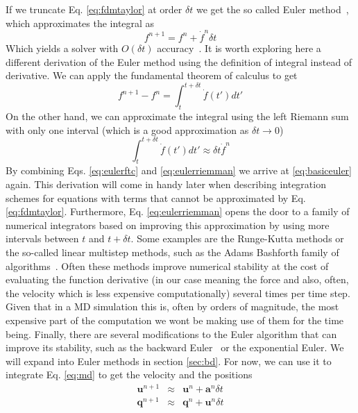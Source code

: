 \documentclass[twoside,openright,titlepage,numbers=noenddot,%
headinclude,footinclude,cleardoublepage=empty,abstract=on,
BCOR=5mm,fontsize=11pt, dvipsnames, paper=b5
]{scrreprt}
\renewcommand{\vec}[1]{\bm{#1}}
\newcommand{\dt}{\delta t}
\newcommand{\ppos}{q}
\newcommand{\pvel}{u}
\begin{document}
If we truncate Eq. \eqref{eq:fdmtaylor} at order $\dt$ we get the so called Euler method~\cite{Butcher2016}, which approximates the integral as
\begin{equation}
  \label{eq:basiceuler}
  f^{n+1} = f^n + \dot{f}^n\dt
\end{equation}
Which yields a solver with $O(\dt)$ accuracy~\cite{Butcher2016}.
It is worth exploring here a different derivation of the Euler method using the definition of integral instead of derivative. We can apply the fundamental theorem of calculus to get
\begin{equation}
  \label{eq:eulerftc}
  f^{n+1} - f^n = \int_t^{t+\dt}\dot{f}(t')dt'
\end{equation}
On the other hand, we can approximate the integral using the left Riemann sum with only one interval (which is a good approximation as $\dt\rightarrow 0$)
\begin{equation}
  \label{eq:eulerriemman}
  \int_t^{t+\dt}\dot{f}(t')dt' \approx \dt \dot{f}^n
\end{equation}
By combining Eqs. \eqref{eq:eulerftc} and \eqref{eq:eulerriemman} we arrive at \eqref{eq:basiceuler} again.
This derivation will come in handy later when describing integration schemes for equations with terms that cannot be approximated by Eq. \eqref{eq:fdmtaylor}.
Furthermore, Eq. \eqref{eq:eulerriemman} opens the door to a family of numerical integrators based on improving this approximation by using more intervals between $t$ and $t+\dt$. Some examples are the Runge-Kutta methods or the so-called linear multistep methods, such as the Adams Bashforth family of algorithms~\cite{Butcher2016}.
Often these methods improve numerical stability at the cost of evaluating the function derivative (in our case meaning the force and also, often, the velocity which is less expensive computationally) several times per time step. Given that in a \gls{MD} simulation this is, often by orders of magnitude, the most expensive part of the computation we wont be making use of them for the time being.
Finally, there are several modifications to the Euler algorithm that can improve its stability, such as the backward Euler~\cite{Butcher2016} or the exponential Euler\cite{Butcher2016}.
We will expand into Euler methods in section \ref{sec:bd}.
For now, we can use it to integrate Eq. \eqref{eq:md} to get the velocity and the positions
\begin{equation}
  \label{eq:basiceulermd}
  \begin{aligned}
  \vec{\pvel}^{n+1} &\approx& \vec{\pvel}^n + \vec{a}^n\dt\\
  \vec{\ppos}^{n+1} &\approx& \vec{\ppos}^n + \vec{\pvel}^n\dt
\end{aligned}
\end{equation}
\end{document}
